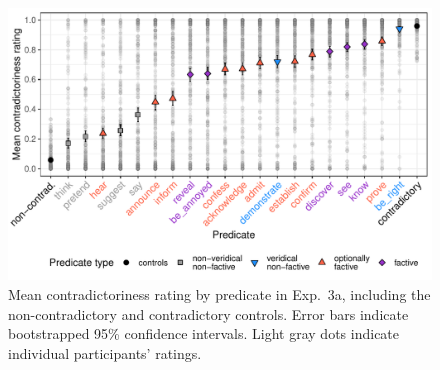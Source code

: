 \documentclass[11pt,fleqn]{article}
\newcommand{\6}{\mbox{$[\hspace*{-.6mm}[$}}
\newcommand{\9}{\mbox{$]\hspace*{-.6mm}]$}}
\begin{document}
{%

\begin{figure}[h!]
\centering

\includegraphics[width=.7\paperwidth]{../../results/2-veridicality2/graphs/means-contradictoriness-by-predicate-variability}

\caption{Mean contradictoriness rating by predicate in Exp.~3a, including the non-contradictory and contradictory controls. Error bars indicate bootstrapped 95\% confidence intervals. Light gray dots indicate individual participants' ratings.}
\label{f-veridicality-predicate2}
\end{figure}

}
\end{document}
